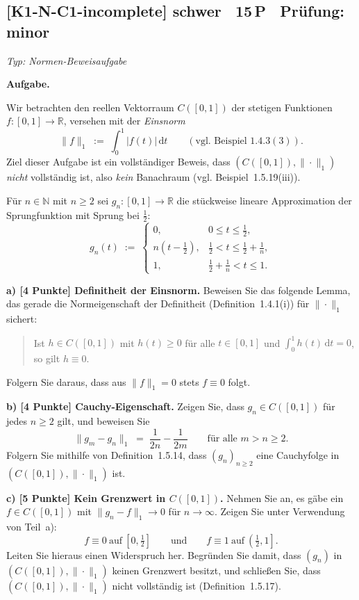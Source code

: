 \documentclass[a4paper,11pt]{article}
\begin{document}
\subsection*{[K1-N-C1-incomplete] \normalfont schwer \textbullet\ 15\,P \textbullet\ Pr\"ufung: minor}
\textit{Typ: Normen-Beweisaufgabe}\par\smallskip
\textbf{Aufgabe.}\par
Wir betrachten den reellen Vektorraum $C([0,1])$ der stetigen Funktionen $f\colon[0,1]\to\mathbb{R}$, versehen mit der \emph{Einsnorm}
\[
\|f\|_1 \;:=\; \int_0^1 |f(t)|\,\mathrm{d}t
\qquad(\text{vgl. Beispiel }1.4.3(3)).
\]
Ziel dieser Aufgabe ist ein vollständiger Beweis, dass $(C([0,1]),\|\cdot\|_1)$ \emph{nicht} vollständig ist, also \emph{kein} Banachraum (vgl. Beispiel~1.5.19(iii)).

Für $n\in\mathbb{N}$ mit $n\ge 2$ sei $g_n\colon[0,1]\to\mathbb{R}$ die stückweise lineare Approximation der Sprungfunktion mit Sprung bei $\tfrac12$:
\[
g_n(t) \;:=\;
\begin{cases}
0, & 0 \le t \le \tfrac12,\\[2pt]
n\!\left(t-\tfrac12\right), & \tfrac12 < t \le \tfrac12+\tfrac1n,\\[2pt]
1, & \tfrac12+\tfrac1n < t \le 1.
\end{cases}
\]

\textbf{a) [4 Punkte] Definitheit der Einsnorm.}\;
Beweisen Sie das folgende Lemma, das gerade die Normeigenschaft der Definitheit (Definition~1.4.1(i)) für $\|\cdot\|_1$ sichert:
\begin{quote}
Ist $h\in C([0,1])$ mit $h(t)\ge 0$ für alle $t\in[0,1]$ und $\displaystyle\int_0^1 h(t)\,\mathrm{d}t = 0$, so gilt $h\equiv 0$.
\end{quote}
Folgern Sie daraus, dass aus $\|f\|_1=0$ stets $f\equiv 0$ folgt.

\textbf{b) [4 Punkte] Cauchy-Eigenschaft.}\;
Zeigen Sie, dass $g_n\in C([0,1])$ für jedes $n\ge 2$ gilt, und beweisen Sie
\[
\|g_m-g_n\|_1 \;=\; \frac{1}{2n}-\frac{1}{2m}
\qquad\text{für alle } m>n\ge 2.
\]
Folgern Sie mithilfe von Definition~1.5.14, dass $(g_n)_{n\ge 2}$ eine Cauchyfolge in $(C([0,1]),\|\cdot\|_1)$ ist.

\textbf{c) [5 Punkte] Kein Grenzwert in $C([0,1])$.}\;
Nehmen Sie an, es gäbe ein $f\in C([0,1])$ mit $\|g_n-f\|_1\to 0$ für $n\to\infty$. Zeigen Sie unter Verwendung von Teil~a):
\[
f\equiv 0 \ \text{auf}\ \left[0,\tfrac12\right]
\qquad\text{und}\qquad
f\equiv 1 \ \text{auf}\ \left(\tfrac12,1\right].
\]
Leiten Sie hieraus einen Widerspruch her. Begründen Sie damit, dass $(g_n)$ in $(C([0,1]),\|\cdot\|_1)$ keinen Grenzwert besitzt, und schließen Sie, dass $(C([0,1]),\|\cdot\|_1)$ nicht vollständig ist (Definition~1.5.17).
\end{document}
